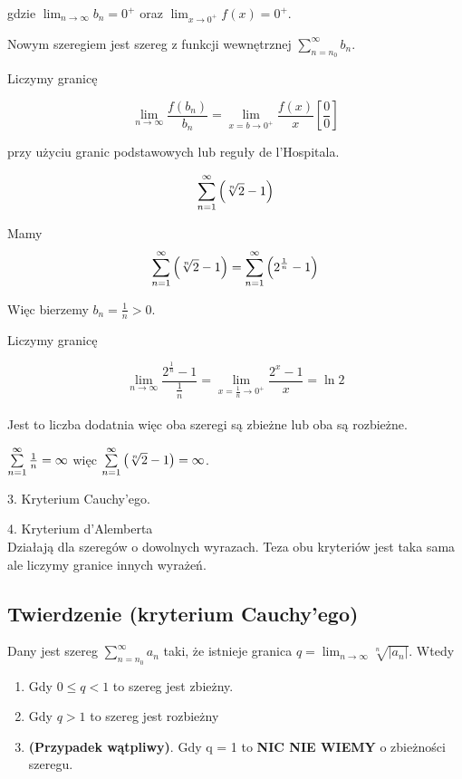 gdzie $ \lim_{n \to \infty} b_n = 0^+ $ oraz $ \lim_{x \to 0^+} f(x) = 0^+ $.

Nowym szeregiem jest szereg z funkcji wewnętrznej $ \sum\limits_{n = n_0}^{\infty} b_n $.

Liczymy granicę 

$$ \lim_{n \to \infty} \frac{f(b_n)}{b_n} = \lim_{x=b \to 0^+} \frac{f(x)}{x} \left[ \frac{0}{0} \right] $$

przy użyciu granic podstawowych lub reguły de l'Hospitala. \\

\begin{przyklad}

$$ \sum\limits_{n = 1}^{\infty} \left( \sqrt[n]{2} - 1 \right) $$

Mamy $$ \sum\limits_{n = 1}^{\infty} \left( \sqrt[n]{2} - 1 \right) = \sum\limits_{n = 1}^{\infty} \left( 2^{\frac{1}{n}} - 1 \right) $$

Więc bierzemy $ b_n = \frac{1}{n} > 0 $.

Liczymy granicę

$$ \lim_{n \to \infty} \frac{2^{\frac{1}{n}} - 1}{\frac{1}{n}} = \lim_{x = \frac{1}{n} \to 0^+} \frac{2^x - 1}{x} = \ln 2 $$ \\

Jest to liczba dodatnia więc oba szeregi są zbieżne lub oba są rozbieżne.

$ \sum\limits_{n = 1}^{\infty} \frac{1}{n} = \infty $ więc $ \sum\limits_{n = 1}^{\infty} \left( \sqrt[n]{2} - 1 \right) = \infty $.
\end{przyklad}

3. Kryterium Cauchy'ego.

4. Kryterium d'Alemberta \\

Działają dla szeregów o dowolnych wyrazach. Teza obu kryteriów jest taka sama ale liczymy granice innych wyrażeń.


\subsection*{Twierdzenie (kryterium Cauchy'ego)}

Dany jest szereg $ \sum\limits_{n = n_0}^{\infty} a_n $ taki, że istnieje granica $ q = \lim_{n \to \infty} \sqrt[n]{|a_n|} $. Wtedy

\begin{enumerate}
    \item Gdy $ 0 \leq q < 1 $ to szereg jest zbieżny.
    \item Gdy $ q > 1 $ to szereg jest rozbieżny
    \item \textbf{(Przypadek wątpliwy)}. Gdy q = 1 to \textbf{NIC NIE WIEMY} o zbieżności szeregu. \\
\end{enumerate}

